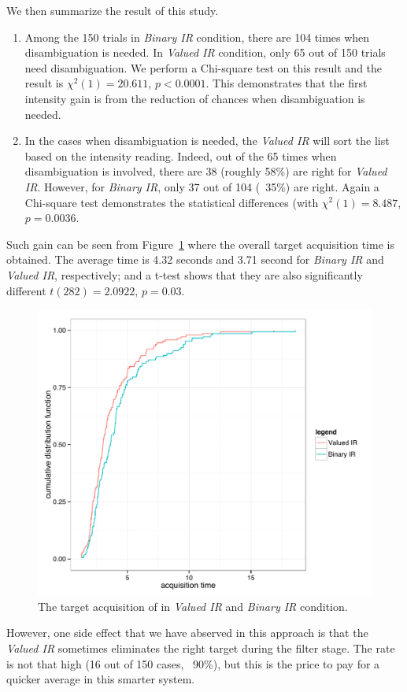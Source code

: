 We then summarize the result of this study. 
\begin{enumerate}
\item Among the 150 trials in {\em Binary IR} condition, there are 104 times when disambiguation is needed. In {\em Valued IR} condition, only 65 out of 150 trials need disambiguation. We perform a Chi-square test on this result and the result is $\chi^2(1) = 20.611$, $p < 0.0001$.  This demonstrates that the first intensity gain is from the reduction of chances when disambiguation is needed.
\item In the cases when disambiguation is needed, the {\em Valued IR} will sort the list based on the intensity reading. Indeed, out of the 65 times when disambiguation is involved, there are 38 (roughly 58\%) are right for {\em Valued IR}. However, for {\em Binary IR}, only 37 out of 104 (~35\%) are right. Again a Chi-square test demonstrates the statistical differences (with $\chi^2(1) = 8.487$, $p = 0.0036$. 
\end{enumerate}

Such gain can be seen from Figure~\ref{fig:study2} where the overall target acquisition time is obtained. The average time is 4.32 seconds and 3.71 second for {\em Binary IR} and {\em Valued IR}, respectively; and a t-test shows that they are also significantly different $t(282)=2.0922$, $p=0.03$.

\begin{figure}[t]
\centering
\includegraphics[width=0.9\columnwidth]{figures/study2_time.pdf}
\caption{The target acquisition of in {\em Valued IR} and {\em Binary IR} condition.}
\label{fig:study2}
\end{figure}

However, one side effect that we have abserved in this approach is that the {\em Valued IR} sometimes eliminates the right target during the filter stage. The rate is not that high (16 out of 150 cases, ~90\%), but this is the price to pay for a quicker average in this smarter system.

